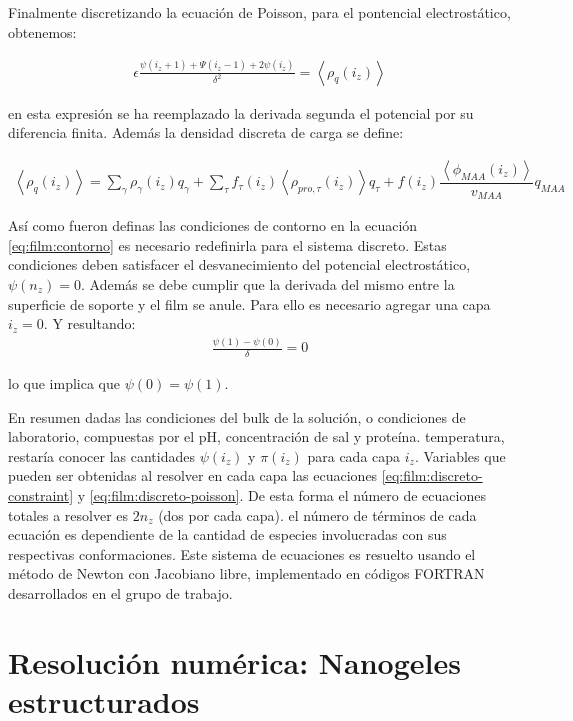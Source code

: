 Finalmente discretizando la ecuaci\'on de Poisson, para el pontencial electrost\'atico, obtenemos:

\begin{align}
	\epsilon \frac{\psi(i_z +1) + \Psi(i_z -1) +2\psi(i_z)}{\delta^2} = \left< \rho_q(i_z)\right>
	\label{eq:film:discreto-poisson}
\end{align}

\noindent en esta expresi\'on se ha reemplazado la derivada segunda el potencial por su diferencia finita. Adem\'as la densidad discreta de carga se define:


\begin{align}
	\left<\rho_q(i_z)\right> = \sum_{\gamma } {\rho_\gamma(i_z) q_\gamma + \sum_\tau{f_\tau(i_z) \left<\rho_{pro,\tau}(i_z)\right> q_\tau} +  f(i_z)\dfrac{\left<\phi_{MAA}(i_z)\right>}{v_{MAA}}q_{MAA}}
	\label{eq:film:rho_charge-discreto}
\end{align}


As\'i como fueron definas las condiciones de contorno en la ecuaci\'on \ref{eq:film:contorno} es necesario redefinirla para el sistema discreto. Estas condiciones deben satisfacer el desvanecimiento del potencial electrost\'atico, $\psi(n_z) =0 $. Adem\'as se debe cumplir que la derivada del mismo entre la superficie de soporte y el film se anule.
Para ello es necesario agregar una capa $i_z = 0$.
Y resultando:
\begin{align}
	\frac{\psi(1) - \psi(0)}{\delta} = 0
\end{align}

\noindent lo que implica que $\psi(0) =  \psi(1)$.

En resumen dadas las condiciones del bulk de la soluci\'on, o condiciones de laboratorio, compuestas por el pH, concentraci\'on de sal y prote\'ina. temperatura, restar\'ia conocer las cantidades $\psi(i_z)$ y $\pi(i_z)$ para cada capa $i_z$. Variables que pueden ser obtenidas al resolver en cada capa las ecuaciones \ref{eq:film:discreto-constraint} y \ref{eq:film:discreto-poisson}.
De esta forma el n\'umero de ecuaciones totales a resolver es $2n_z$ (dos por cada capa). el n\'umero de t\'erminos de cada ecuaci\'on es dependiente de la cantidad de especies involucradas con sus respectivas conformaciones. 
Este sistema de ecuaciones es resuelto usando el m\'etodo de Newton con Jacobiano libre, implementado en c\'odigos FORTRAN desarrollados en el grupo de trabajo.



\section{Resoluci\'on num\'erica: Nanogeles estructurados}


